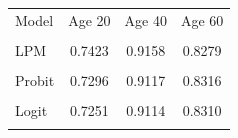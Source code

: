 \begin{tabular}{lccc}
\toprule
Model & Age 20 & Age 40 & Age 60 \\\\ \midrule
LPM    & 0.7423 & 0.9158 & 0.8279 \\\\
Probit & 0.7296 & 0.9117 & 0.8316 \\\\
Logit  & 0.7251 & 0.9114 & 0.8310 \\\\
\bottomrule
\end{tabular}
